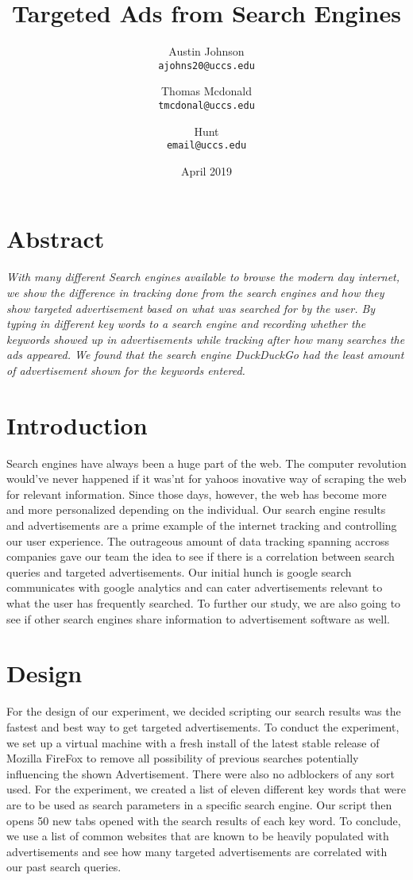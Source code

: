 \documentclass{article}
\author{Austin Johnson \\
\texttt{ajohns20@uccs.edu}
\and 
Thomas Mcdonald \\
\texttt{tmcdonal@uccs.edu}
\and 
Hunt \\
\texttt{email@uccs.edu}
}
\title{Targeted Ads from Search Engines}
\date{April 2019}
\begin{document}
\maketitle


\section{Abstract}
\small
\textit{
\qquad With many different Search engines available to browse the modern day internet, we show the difference in tracking done from the search engines and how they show targeted advertisement based on what was searched for by the user. By typing in different key words to a search engine and recording whether the keywords showed up in advertisements while tracking after how many searches the ads appeared. We found that the search engine DuckDuckGo had the least amount of advertisement shown for the keywords entered. }    

\section{Introduction}


\qquad Search engines have always been a huge part of the web. The computer revolution would've never happened if it was'nt for yahoos inovative way of scraping the web for relevant information. Since those days, however, the web has become more and more personalized depending on the individual. Our search engine results and advertisements are a prime example of the internet tracking and controlling our user experience. The outrageous amount of data tracking spanning accross companies gave our team the idea to see if there is a correlation between search queries and targeted advertisements. Our initial hunch is google search communicates with google analytics and can cater advertisements relevant to what the user has frequently searched. To further our study, we are also going to see if other search engines share information to advertisement software as well.  


\section{Design}
\qquad For the design of our experiment, we decided scripting our search results was the fastest and best way to get targeted advertisements. To conduct the experiment, we set up a virtual machine with a fresh install of the latest stable release of Mozilla FireFox to remove all possibility of previous searches potentially influencing the shown Advertisement. There were also no adblockers of any sort used.  For the experiment, we created a list of eleven different key words that were are to be used as search parameters in a specific search engine. Our script then opens 50 new tabs opened with the search results of each key word. To conclude, we use a list of common websites that are known to be heavily populated with advertisements and see how many targeted advertisements are correlated with our past search queries. 
\end{document}

